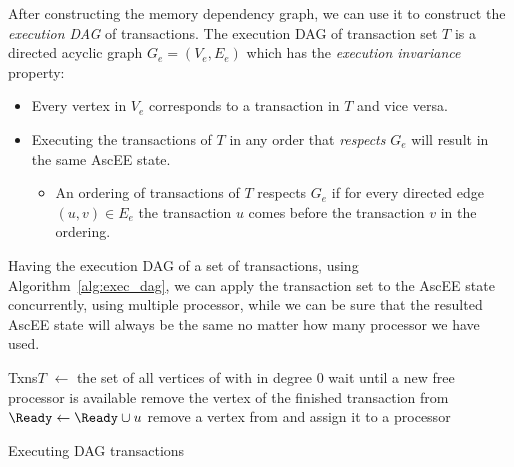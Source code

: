 After constructing the memory dependency graph, we can use it to construct the
\emph{execution DAG} of transactions. The execution DAG of transaction set \(T\) is a directed acyclic
graph \(G_e = (V_e,E_e)\) which has the \emph{execution invariance} property:
\begin{itemize}
    \item Every vertex in \(V_e\) corresponds to a transaction in \(T\) and vice versa.
    \item Executing the transactions of \(T\) in any order that \emph{respects} \(G_e\) will result in
    the same AscEE state.
    \begin{itemize}
        \item An ordering of transactions of \(T\) respects \(G_e\) if for every directed edge \((u,v) \in E_e\)
        the transaction \(u\) comes before the transaction \(v\) in the ordering.
    \end{itemize}
\end{itemize}

Having the execution DAG of a set of transactions, using Algorithm~\ref{alg:exec_dag}, we can apply the transaction
set to the AscEE state concurrently, using multiple processor, while we can be sure that the resulted AscEE state will
always be the same no matter how many processor we have used.

\begin{algorithm}
    \DontPrintSemicolon
    \SetKwData
    {Txns}{$T$}
    \BlankLine
    \Ready $\gets$ the set of all vertices of \Vertices with in degree 0\;
    \While{$\Vertices \neq \varnothing$}
    {
        wait until a new free processor is available\;
        {
            remove the vertex of the finished transaction \V from \Graph\;
            {
                {
                    $\Ready \gets \Ready \cup u$\;
                }
            }
        }
        \If{$\Ready \neq \varnothing$}
        {
            remove a vertex from \Ready and assign it to a processor\;
        }
    }
    \caption{Executing DAG transactions}\label{alg:exec_dag}
\end{algorithm}

